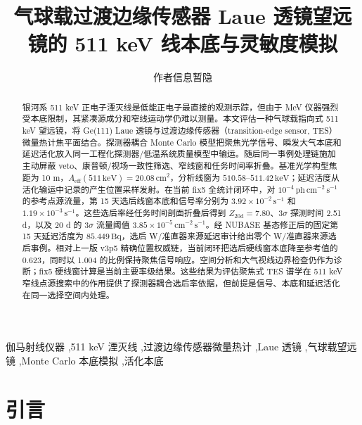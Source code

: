 \documentclass[preprint,12pt]{elsarticle}
\newcommand{\keV}{\,\mathrm{keV}}
\newcommand{\cms}{\,\mathrm{cm^{-2}\,s^{-1}}}
\newcommand{\cps}{\,\mathrm{s^{-1}}}
\newcommand{\aeff}{A_{\mathrm{eff}}}
\begin{document}
\begin{frontmatter}

\title{气球载过渡边缘传感器 Laue 透镜望远镜的 511 keV 线本底与灵敏度模拟}

\author[inst1]{作者信息暂隐}
\address[inst1]{单位信息暂隐}

\begin{abstract}
银河系 511 keV 正电子湮灭线是低能正电子最直接的观测示踪，但由于 MeV 仪器强烈受本底限制，其紧凑源成分和窄线运动学仍难以测量。本文评估一种气球载指向式 511 keV 望远镜，将 Ge(111) Laue 透镜与过渡边缘传感器（transition-edge sensor, TES）微量热计焦平面结合。探测器耦合 Monte Carlo 模型把聚焦光学信号、瞬发大气本底和延迟活化放入同一工程化探测器/低温系统质量模型中输运。随后同一事例处理链施加主动屏蔽 veto、康普顿/视场一致性筛选、窄线窗和任务时间率折叠。基准光学构型焦距为 10 m，$\aeff(511\keV)=20.08\,\mathrm{cm^2}$，分析线窗为 $510.58$--$511.42\keV$；延迟活度从活化输运中记录的产生位置采样发射。在当前 fix5 全统计闭环中，对 $10^{-4}\,\mathrm{ph\,cm^{-2}\,s^{-1}}$ 的参考点源流量，第 15 天选后线窗本底和信号率分别为 $3.92\times10^{-2}\cps$ 和 $1.19\times10^{-3}\cps$。这些选后率经任务时间剖面折叠后得到 $Z_{20\mathrm{d}}=7.80$、$3\sigma$ 探测时间 2.51 d，以及 20 d 的 $3\sigma$ 流量阈值 $3.85\times10^{-5}\cms$。经 NUBASE 基态修正后的固定第 15 天延迟活度为 $85.449\,\mathrm{Bq}$，选后 W/准直器来源延迟审计给出零个 W/准直器来源选后事例。相对上一版 v3p5 精确位置权威链，当前闭环把选后硬线窗本底降至参考值的 0.623，同时以 1.004 的比例保持聚焦信号响应。空间分析和大气视线边界检查仍作为诊断；fix5 硬线窗计算是当前主要率级结果。这些结果为评估聚焦式 TES 谱学在 511 keV 窄线点源搜索中的作用提供了探测器耦合选后率依据，但前提是信号、本底和延迟活化在同一选择空间内处理。
\end{abstract}

\begin{keyword}
伽马射线仪器 \sep 511 keV 湮灭线 \sep 过渡边缘传感器微量热计 \sep Laue 透镜 \sep 气球载望远镜 \sep Monte Carlo 本底模拟 \sep 活化本底
\end{keyword}

\end{frontmatter}


\section{引言}
\label{sec:intro}
\end{document}
